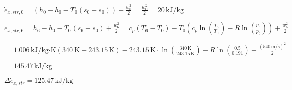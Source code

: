\( \dot{e}_{x,str,0} = (h_0 - h_0 - T_0(s_0 - s_0)) + \frac{w_0^2}{2} = \frac{w_0^2}{2} = 20 \, \text{kJ/kg} \)  

\( \dot{e}_{x,str,6} = h_6 - h_0 - T_0(s_6 - s_0) + \frac{w_6^2}{2} = c_p(T_6 - T_0) - T_0(c_p \ln \left( \frac{T_6}{T_0} \right) - R \ln \left( \frac{p_6}{p_0} \right)) + \frac{w_6^2}{2} \)  

\( = 1.006 \, \text{kJ/kg·K} \left( 340 \, \text{K} - 243.15 \, \text{K} \right) - 243.15 \, \text{K} \cdot \ln \left( \frac{340 \, \text{K}}{243.15 \, \text{K}} \right) - R \ln \left( \frac{0.5}{0.191} \right) + \frac{(540 \, \text{m/s})^2}{2} \)  

\( = 145.47 \, \text{kJ/kg} \)  

\( \Delta \dot{e}_{x,str} = 125.47 \, \text{kJ/kg} \)